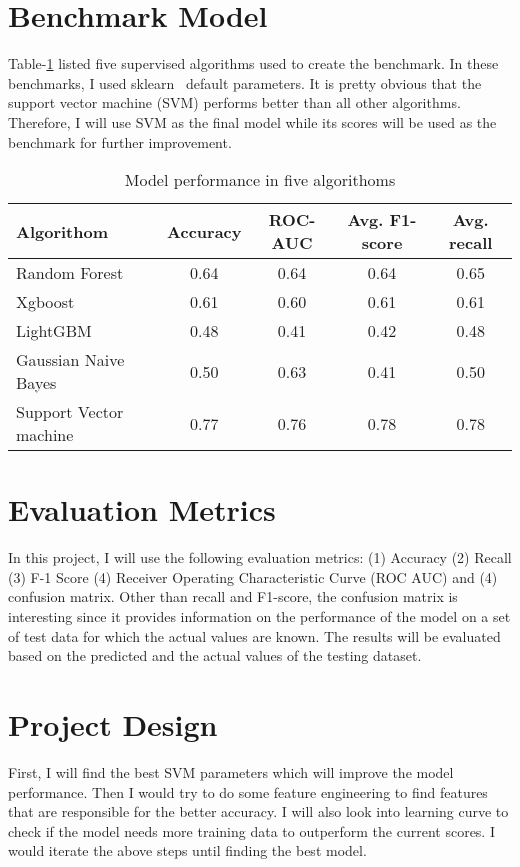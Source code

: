\documentclass[12pt]{article}
\begin{document}
    
    \section{Benchmark Model}
    Table-\ref{tab:model_benchmark} listed five supervised algorithms used to create the benchmark. In these benchmarks, I used sklearn~\citep{scikit-learn} default parameters. It is pretty obvious that the support vector machine (SVM) performs better than all other algorithms. Therefore, I will use SVM as the final model while its scores will be used as the benchmark for further improvement.
    
    \begin{table}[ht]
        \caption{Model performance in five algorithoms}
        \label{tab:model_benchmark}
        \centering
        \begin{tabular}{l c c c c}
            \hline
            Algorithom & Accuracy & ROC-AUC & Avg. F1-score & Avg. recall \\
            \hline
            Random Forest & 0.64 & 0.64 & 0.64 & 0.65 \\
            Xgboost & 0.61 & 0.60 & 0.61 & 0.61 \\
            LightGBM & 0.48 & 0.41 & 0.42 & 0.48 \\
            Gaussian Naive Bayes & 0.50 & 0.63 & 0.41 & 0.50 \\
            Support Vector machine & 0.77 & 0.76 & 0.78 & 0.78 \\
            \hline
        \end{tabular}
    \end{table}
    
    \section{Evaluation Metrics}

In this project, I will use the following evaluation metrics:  (1) Accuracy (2) Recall (3) F-1 Score (4) Receiver Operating Characteristic Curve (ROC AUC) and (4) confusion matrix. Other than recall and F1-score, the confusion matrix is interesting since it provides information on the performance of the model on a set of test data for which the actual values are known. The results will be evaluated based on the predicted and the actual values of the testing dataset.
    
    \section{Project Design}

    First, I will find the best SVM parameters which will improve the model performance. Then I would try to do some feature engineering to find features that are responsible for the better accuracy. I will also look into learning curve to check if the model needs more training data to outperform the current scores. I would iterate the above steps until finding the best model.
    
    
    
    
    
\end{document}
